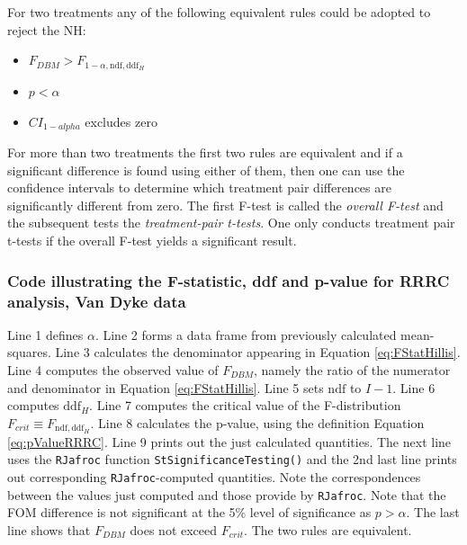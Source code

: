\documentclass[
]{book}
\providecommand{\tightlist}{%
  \setlength{\itemsep}{0pt}\setlength{\parskip}{0pt}}
\begin{document}
For two treatments any of the following equivalent rules could be adopted to reject the NH:

\begin{itemize}
\tightlist
\item
  \(F_{DBM} > F_{1-\alpha,\text{ndf},\text{ddf}_H}\)
\item
  \(p < \alpha\)
\item
  \(CI_{1-alpha}\) excludes zero
\end{itemize}

For more than two treatments the first two rules are equivalent and if a significant difference is found using either of them, then one can use the confidence intervals to determine which treatment pair differences are significantly different from zero. The first F-test is called the \emph{overall F-test} and the subsequent tests the \emph{treatment-pair t-tests}. One only conducts treatment pair t-tests if the overall F-test yields a significant result.

\hypertarget{code-illustrating-the-f-statistic-ddf-and-p-value-for-rrrc-analysis-van-dyke-data}{%
\subsubsection{Code illustrating the F-statistic, ddf and p-value for RRRC analysis, Van Dyke data}\label{code-illustrating-the-f-statistic-ddf-and-p-value-for-rrrc-analysis-van-dyke-data}}

Line 1 defines \(\alpha\). Line 2 forms a data frame from previously calculated mean-squares. Line 3 calculates the denominator appearing in Equation \eqref{eq:FStatHillis}. Line 4 computes the observed value of \(F_{DBM}\), namely the ratio of the numerator and denominator in Equation \eqref{eq:FStatHillis}. Line 5 sets \(\text{ndf}\) to \(I - 1\). Line 6 computes \(\text{ddf}_H\). Line 7 computes the critical value of the F-distribution \(F_{crit}\equiv F_{\text{ndf},\text{ddf}_H}\). Line 8 calculates the p-value, using the definition Equation \eqref{eq:pValueRRRC}. Line 9 prints out the just calculated quantities. The next line uses the \texttt{RJafroc} function \texttt{StSignificanceTesting()} and the 2nd last line prints out corresponding \texttt{RJafroc}-computed quantities. Note the correspondences between the values just computed and those provide by \texttt{RJafroc}. Note that the FOM difference is not significant at the 5\% level of significance as \(p > \alpha\). The last line shows that \(F_{DBM}\) does not exceed \(F_{crit}\). The two rules are equivalent.
\end{document}
